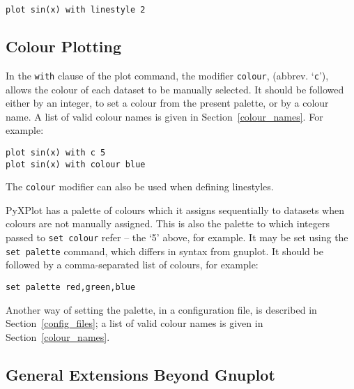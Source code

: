 \documentclass[a4paper,onecolumn,11pt]{book}
\begin{document}
\begin{verbatim}
plot sin(x) with linestyle 2
\end{verbatim}

\subsection{Colour Plotting}

 In the \texttt{with}
clause of the plot command, the modifier \texttt{colour}, (abbrev.
`\texttt{c}'), allows the colour of each dataset to be manually selected. It
should be followed either by an integer, to set a colour from the present
palette, or by a colour name. A list of valid colour names is given in
Section~\ref{colour_names}. For example:

\begin{verbatim}
plot sin(x) with c 5
plot sin(x) with colour blue
\end{verbatim}

\noindent The \texttt{colour} modifier can also be used when defining linestyles.

 PyXPlot has a palette of colours which it assigns
sequentially to datasets when colours are not manually assigned. This is also
the palette to which integers passed to \texttt{set colour} refer -- the `5'
above, for example. It may be set using the \texttt{set palette} command, which
differs in syntax from gnuplot. It should be followed by a comma-separated list
of colours, for example:

\begin{verbatim}
set palette red,green,blue
\end{verbatim}

Another way of setting the palette, in a configuration file, is described in
Section~\ref{config_files}; a list of valid colour names is given in
Section~\ref{colour_names}.

\subsection{General Extensions Beyond Gnuplot}
\end{document}
